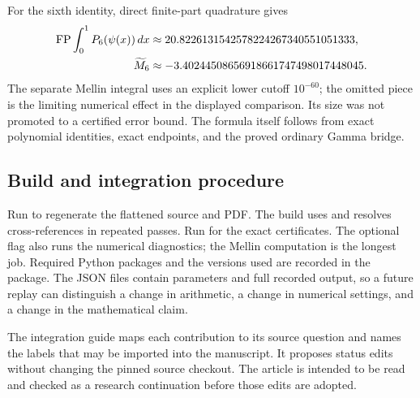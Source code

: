 For the sixth identity, direct finite-part quadrature gives
\begin{align*}
 \operatorname{FP}\int_0^1P_6(\psi(x))\,dx
  &\approx20.8226131542578224267340551051333,\\
 \widetilde M_6
  &\approx-3.40244508656918661747498017448045.
\end{align*}
The separate Mellin integral uses an explicit lower cutoff $10^{-60}$;
the omitted piece is the limiting numerical effect in the displayed
comparison. Its size was not promoted to a certified error bound. The
formula itself follows from exact polynomial identities, exact endpoints,
and the proved ordinary Gamma bridge.

\subsection{Build and integration procedure}

Run  to regenerate the flattened source and PDF.
The build uses  and resolves cross-references in repeated
passes. Run  for the exact
certificates. The optional flag  also runs the numerical
diagnostics; the Mellin computation is the longest job.
Required Python packages and the versions used are recorded in the
package. The JSON files contain parameters and full recorded output,
so a future replay can distinguish a change in arithmetic, a change in
numerical settings, and a change in the mathematical claim.

The integration guide maps each contribution to its source question and
names the labels that may be imported into the manuscript. It proposes
status edits without changing the pinned source checkout. The article is
intended to be read and checked as a research continuation before those
edits are adopted.
